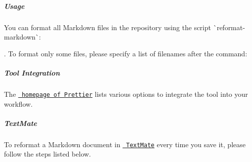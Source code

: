 \label{doc_CODING_md_autotoc_md1004}%
%
\subparagraph*{Usage}

You can format all Markdown files in the repository using the script \`{}reformat-\/markdown\`{}\+:


\begin{DoxyCode}{0}
\end{DoxyCode}


. To format only some files, please specify a list of filenames after the command\+:


\begin{DoxyCode}{0}
\end{DoxyCode}


\label{doc_CODING_md_autotoc_md1005}%
%
\subparagraph*{Tool Integration}

The \href{https://prettier.io}{\texttt{ homepage of Prettier}} lists various options to integrate the tool into your workflow.

\subparagraph*{Text\+Mate}

To reformat a Markdown document in \href{https://macromates.com}{\texttt{ Text\+Mate}} every time you save it, please follow the steps listed below.


